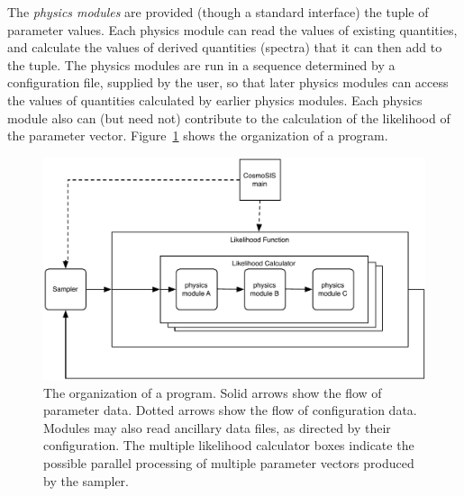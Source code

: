 \documentclass[draftmode,draftwater]{memarticle}
\newcommand{\cosmosis}{\name{CosmoSIS}\xspace}
\begin{document}
The \emph{physics modules} are provided (though a standard interface)
the tuple of parameter values. Each physics module can read the values
of existing quantities, and calculate the values of derived quantities
(\eg spectra) that it can then add to the tuple. The physics modules are run in a
sequence determined by a configuration file, supplied by the user, so
that later physics modules can access the values of quantities
calculated by earlier physics modules. Each physics module also can
(but need not) contribute to the calculation of the likelihood of the
parameter vector. Figure~\ref{fig:despes} shows the organization of a
\cosmosis program.

\begin{figure}[htb]
\includegraphics[width=\textwidth]{despes}
\caption{The organization of a \cosmosis program. Solid arrows
  show the flow of parameter data. Dotted arrows show the flow of
  configuration data. Modules may also read ancillary data files, as
  directed by their configuration. The multiple likelihood calculator
  boxes indicate the possible parallel processing of multiple
  parameter vectors produced by the sampler.}
\label{fig:despes}
\end{figure}

\end{document}
